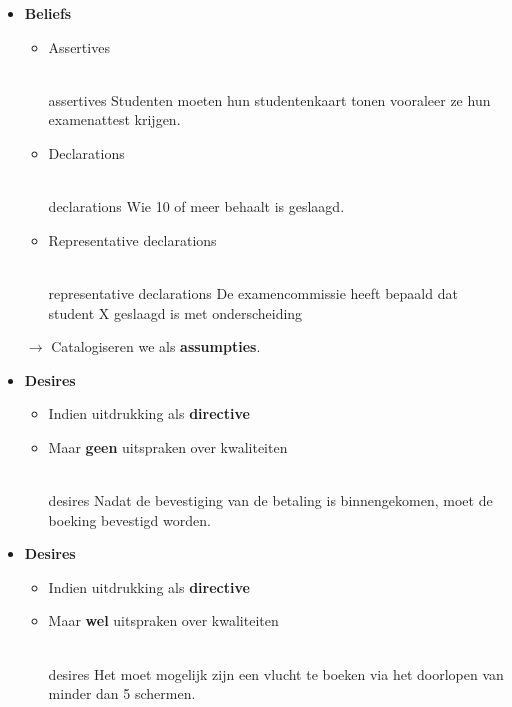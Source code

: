 \documentclass[../../main.tex]{subfiles}
\begin{document}
\begin{itemize}
	\item \textbf{Beliefs}\\
	\begin{itemize}
		\item Assertives
		\\\\
		\begin{ex}{assertives}
		Studenten moeten hun studentenkaart tonen vooraleer ze hun examenattest krijgen.
		\end{ex}
		\item Declarations
		\\\\
		\begin{ex}{declarations}
		Wie 10 of meer behaalt is geslaagd.
		\end{ex}
		\item Representative declarations
		\\\\
		\begin{ex}{representative declarations}
		De examencommissie heeft bepaald dat student X geslaagd is met onderscheiding
		\end{ex}
	\end{itemize}
	$\rightarrow$ Catalogiseren we als \textbf{assumpties}.
	\item \textbf{Desires}
	\begin{itemize}
		\item Indien uitdrukking als \textbf{directive}
		\item Maar \textbf{geen} uitspraken over kwaliteiten \\
		\\
		\begin{ex}{desires}
		Nadat de bevestiging van de betaling is binnengekomen, moet de boeking bevestigd worden.
		\end{ex}
	\end{itemize}
	\item \textbf{Desires}
	\begin{itemize}
		\item Indien uitdrukking als \textbf{directive}
		\item Maar \textbf{wel} uitspraken over kwaliteiten \\
		\\
		\begin{ex}{desires}
		Het moet mogelijk zijn een vlucht te boeken via het
doorlopen van minder dan 5 schermen.
		\end{ex}

\end{itemize}
\end{itemize}
\end{document}
